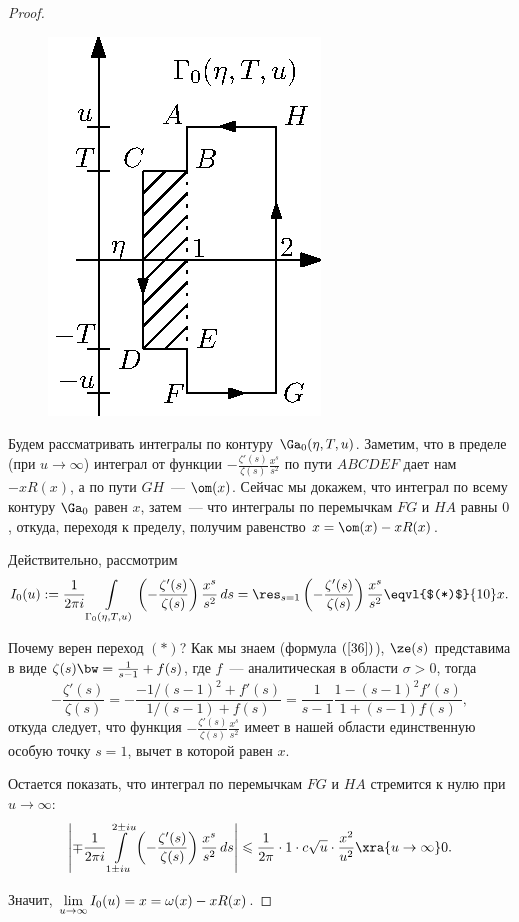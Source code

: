 \begin{proof}
\begin{figure}
\begin{center}
\includegraphics[scale=1.0, trim=20 0 0 0]{05022}
\end{center}
\end{figure}

Будем рассматривать интегралы по контуру $\Ga_0(\eta,T,u)$. Заметим, что 
в пределе (при $u\to\infty$) интеграл от функции $-\frac{\zeta '(s)}{\zeta 
(s)} \frac{x^s}{s^2}$ по пути $ABCDEF$ дает нам $-xR(x)$, а по пути $GH$~—
$\om(x)$. Сейчас мы докажем, что интеграл по всему контуру $\Ga_0$ равен $x$, 
затем~— что интегралы по перемычкам $FG$ и $HA$ равны $0$, откуда, переходя 
к пределу, получим равенство $x = \om(x) - xR(x)$.

Действительно, рассмотрим
$$I_0(u):=\frac{1}{2\pi i} \int\limits_{\Gamma_0(\eta,T,u)}
\left(-\frac{\zeta '(s)}{\zeta (s)}\right)\frac{x^{s}}{s^2}\,ds = 
\res_{s=1} \left(-\frac{\zeta '(s)}{\zeta (s)}\right)\frac{x^s}{s^2}
\eqvl{$(*)$}{10}x.$$

Почему верен переход $(*)$? Как мы знаем (формула $(\ref{36})$), $\ze(s)$ 
представима в виде $\zeta(s) \bw= \frac{1}{s-1} + f(s)$, где $f$~— 
аналитическая в области $\sigma > 0$, тогда
$$-\frac{\zeta '(s)}{\zeta (s)} = -\frac{-1/(s-1)^2 + f'(s)}{1/(s-1) + f(s)} = 
\frac{1}{s-1}\frac{1 - (s-1)^2f'(s)}{1 + (s-1)f(s)},$$
откуда следует, что функция $-\frac{\zeta '(s)}{\zeta (s)} \frac{x^s}{s^2}$
имеет в нашей области единственную особую точку $s=1$, вычет в которой равен 
$x$.

Остается показать, что интеграл по перемычкам $FG$ и $HA$ стремится к нулю 
при $u\to\infty$:
$$\left|\mp\frac{1}{2\pi i} \int\limits_{1 \pm iu}^{2\pm iu}
\left(-\frac{\zeta '(s)}{\zeta (s)}\right)\frac{x^s}{s^2}\,ds\right| \leqslant
\frac{1}{2\pi}\cdot 1\cdot c\sqrt{u}\cdot\frac{x^2}{u^2} \xra{u\to\infty} 0.$$

Значит, $\lim\limits_{u\to\infty}I_0(u) =x= \omega(x) - xR(x)$.
\end{proof}

